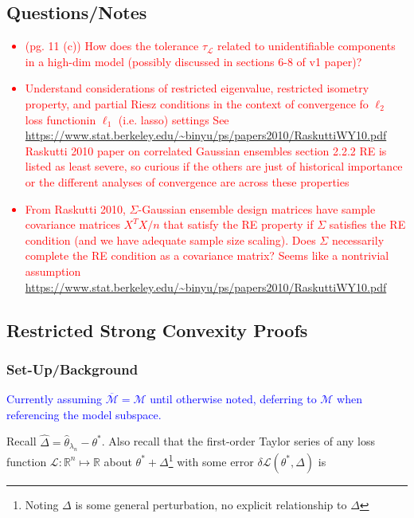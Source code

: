 \documentclass[11pt]{article}
\begin{document}
\subsection*{Questions/Notes}
\textcolor{red}{
	\begin{itemize}
		\item (pg. 11 (c)) How does the tolerance $\tau_\mathcal{L}$ related to unidentifiable components in a high-dim model (possibly discussed in sections 6-8 of v1 paper)? 
		\item Understand considerations of restricted eigenvalue, restricted isometry property, and partial Riesz conditions in the context of convergence fo $\ell_2$ loss functionin $\ell_1$ (i.e. lasso) settings
            \subitem See \url{https://www.stat.berkeley.edu/~binyu/ps/papers2010/RaskuttiWY10.pdf} Raskutti 2010 paper on correlated Gaussian ensembles section 2.2.2
            \subitem RE is listed as least severe, so curious if the others are just of historical importance or the different analyses of convergence are across these properties 
    \item From Raskutti 2010, $\Sigma$-Gaussian ensemble design matrices have sample covariance matrices $X^TX/n$ that satisfy the RE property if $\Sigma$ satisfies the RE condition (and we have adequate sample size scaling). Does $\Sigma$ necessarily complete the RE condition as a covariance matrix? Seems like a nontrivial assumption 
        \subitem \url{https://www.stat.berkeley.edu/~binyu/ps/papers2010/RaskuttiWY10.pdf}
	\end{itemize}
}
	
\newpage 
\subsection*{Restricted Strong Convexity Proofs}

\subsubsection{Set-Up/Background}

\textcolor{blue}{Currently assuming $\overline{\mathcal{M}}=\mathcal{M}$ until otherwise noted, deferring to $\mathcal{M}$ when referencing the model subspace.}\newline 

Recall $\hat\Delta = \hat{\theta}_{\lambda_n} - \theta^*$. Also recall that the first-order Taylor series of any loss function  $\mathcal{L}: \mathbb{R}^n \mapsto \mathbb{R}$ about $\theta^* + \Delta$\footnote{Noting $\Delta$ is some general perturbation, no explicit relationship to $\hat\Delta$} with some error $\delta \mathcal{L}(\theta^*, \Delta)$ is
\end{document}

